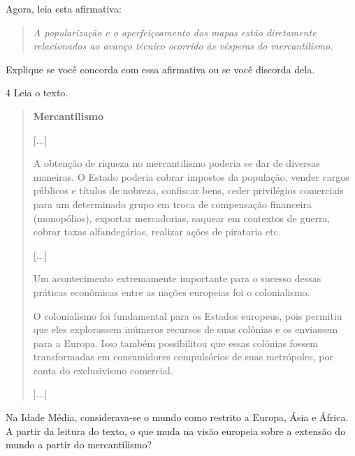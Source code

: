 Agora, leia esta afirmativa:

\begin{quote}
\textit{A popularização e o aperfeiçoamento dos mapas estão diretamente relacionados
ao avanço técnico ocorrido às vésperas do mercantilismo.}
\end{quote}

Explique se você concorda com essa afirmativa ou se você discorda dela.



\num{4} Leia o texto.

\begin{quote}
\textbf{Mercantilismo}

{[}...{]}

A obtenção de riqueza no mercantilismo poderia se dar de diversas
maneiras. O Estado poderia cobrar impostos da população, vender cargos
públicos e títulos de nobreza, confiscar bens, ceder privilégios
comerciais para um determinado grupo em troca de compensação financeira
(monopólios), exportar mercadorias, saquear em contextos de guerra,
cobrar taxas alfandegárias, realizar ações de pirataria
etc.

{[}...{]}

Um acontecimento extremamente importante para o sucesso
dessas práticas econômicas entre as nações europeias foi o
colonialismo.

O colonialismo foi fundamental para os Estados europeus, pois
permitiu que eles explorassem inúmeros recursos de suas colônias e os
enviassem para a Europa. Isso também possibilitou que essas colônias
fossem transformadas em consumidores compulsórios de suas metrópoles,
por conta do exclusivismo comercial.

{[}...{]}

\end{quote}

Na Idade Média, considerava-se o mundo como
restrito a Europa, Ásia e África. A partir da leitura do texto, o que
muda na visão europeia sobre a extensão do mundo a partir do
mercantilismo?




